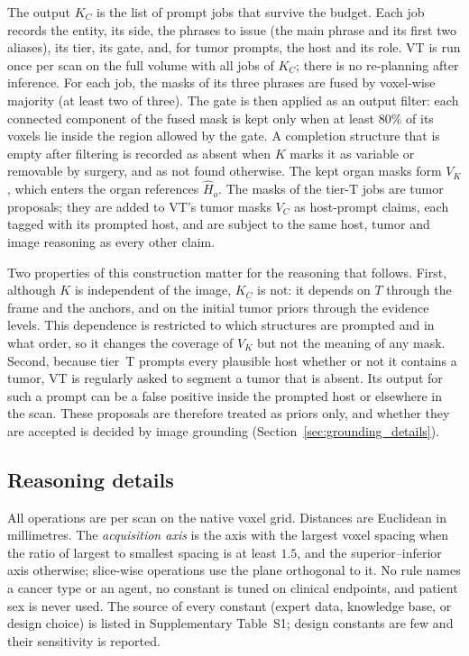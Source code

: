 \documentclass[fleqn,10pt]{olplainarticle}
\begin{document}
The output $K_C$ is the list of prompt jobs that survive the budget. Each job records the entity, its side, the phrases to
issue (the main phrase and its first two aliases), its tier, its gate, and, for tumor prompts, the host and its
role. VT is run once per scan on the full volume with all jobs of $K_C$; there is no re-planning after inference.
For each job, the masks of its three phrases are fused by voxel-wise majority (at least two of three). The gate is then
applied as an output filter: each connected component of the fused mask is kept only when at least $80\%$ of its
voxels lie inside the region allowed by the gate. A completion structure that is empty after filtering is recorded as
absent when $K$ marks it as variable or removable by surgery, and as not found otherwise. The kept organ masks form $V_K$, which enters the organ references
$\hat H_o$. The masks of the tier-T jobs are tumor proposals; they are added to VT's tumor masks $V_C$ as host-prompt
claims, each tagged with its prompted host, and are subject to the same host, tumor and image reasoning as every other claim.

Two properties of this construction matter for the reasoning that follows. First, although $K$ is independent of the
image, $K_C$ is not: it depends on $T$ through the frame and the anchors, and on the initial tumor priors through the
evidence levels. This dependence is restricted to which structures are prompted and in what order, so it changes the
coverage of $V_K$ but not the meaning of any mask. Second, because tier~T prompts every plausible host whether or not it
contains a tumor, VT is regularly asked to segment a tumor that is absent. Its output for such a prompt can be a false
positive inside the prompted host or elsewhere in the scan. These proposals are therefore treated as priors only, and
whether they are accepted is decided by image grounding
(Section~\ref{sec:grounding_details}).

\subsection{Reasoning details}
\label{sec:reasoning_details}

All operations are per scan on the native voxel grid. Distances are Euclidean in millimetres. The \emph{acquisition axis}
is the axis with the largest voxel spacing when the ratio of largest to smallest spacing is at least $1.5$, and the
superior--inferior axis otherwise; slice-wise operations use the plane orthogonal to it. No rule names a cancer type or an
agent, no constant is tuned on clinical endpoints, and patient sex is never used. The source of every constant (expert
data, knowledge base, or design choice) is listed in Supplementary Table~S1; design constants are few and their
sensitivity is reported.
\end{document}
